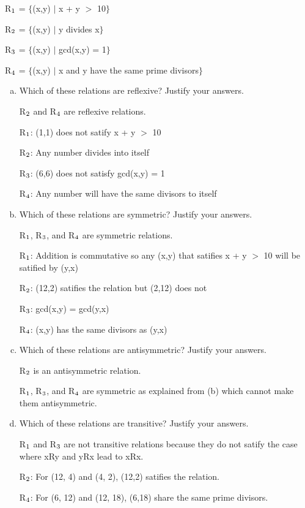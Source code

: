 \documentclass{article} %
\begin{document}
    \begin{center}
      R$\textsubscript{1}$ = $\{$(x,y) $\mid$ x + y $>$ 10$\}$
    \end{center}
    \begin{center}
      R$\textsubscript{2}$ = $\{$(x,y) $\mid$ y divides x$\}$
    \end{center}
    \begin{center}
      R$\textsubscript{3}$ = $\{$(x,y) $\mid$ gcd(x,y) = 1$\}$
    \end{center}
    \begin{center}
      R$\textsubscript{4}$ = $\{$(x,y) $\mid$ x and y have the same prime divisors$\}$
    \end{center}
    \begin{enumerate}[(a)]
      \item {Which of these relations are reflexive? Justify your answers.}
      
      R$\textsubscript{2}$ and R$\textsubscript{4}$ are reflexive relations.

      R$\textsubscript{1}$: (1,1) does not satify x + y $>$ 10

      R$\textsubscript{2}$: Any number divides into itself

      R$\textsubscript{3}$: (6,6) does not satisfy gcd(x,y) = 1

      R$\textsubscript{4}$: Any number will have the same divisors to itself
      \item {Which of these relations are symmetric? Justify your answers.}
      
      R$\textsubscript{1}$, R$\textsubscript{3}$, and R$\textsubscript{4}$ are symmetric relations.

      R$\textsubscript{1}$: Addition is commutative so any (x,y) that satifies x + y $>$ 10 will be satified by (y,x)

      R$\textsubscript{2}$: (12,2) satifies the relation but (2,12) does not

      R$\textsubscript{3}$: gcd(x,y) = gcd(y,x)

      R$\textsubscript{4}$: (x,y) has the same divisors as (y,x)
      \item {Which of these relations are antisymmetric? Justify your answers.}
      
      R$\textsubscript{2}$ is an antisymmetric relation.

      R$\textsubscript{1}$, R$\textsubscript{3}$, and R$\textsubscript{4}$ are symmetric as explained from (b) which cannot make them antisymmetric.
      \item {Which of these relations are transitive? Justify your answers.}
      
      R$\textsubscript{1}$ and R$\textsubscript{3}$ are not transitive relations because they do not satify the case where xRy and yRx lead to xRx. 
      
      R$\textsubscript{2}$: For (12, 4) and (4, 2), (12,2) satifies the relation.
      
      R$\textsubscript{4}$: For (6, 12) and (12, 18), (6,18) share the same prime divisors.
    \end{enumerate}
\end{document}
